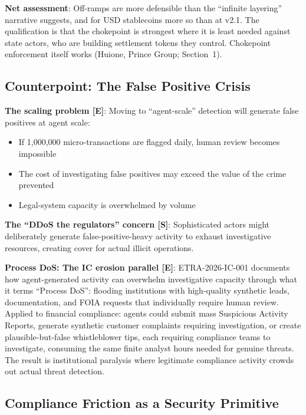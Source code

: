 \documentclass[11pt,letterpaper]{article}
\begin{document}
\textbf{Net assessment}: Off-ramps are more defensible than the ``infinite layering'' narrative suggests, and for USD stablecoins more so than at v2.1. The qualification is that the chokepoint is strongest where it is least needed against state actors, who are building settlement tokens they control. Chokepoint enforcement itself works (Huione, Prince Group; Section~1).

\subsection{Counterpoint: The False Positive Crisis}

\textbf{The scaling problem [E]}: Moving to ``agent-scale'' detection will generate false positives at agent scale:
\begin{itemize}
  \item If 1,000,000 micro-transactions are flagged daily, human review becomes impossible
  \item The cost of investigating false positives may exceed the value of the crime prevented
  \item Legal-system capacity is overwhelmed by volume
\end{itemize}

\textbf{The ``DDoS the regulators'' concern [S]}: Sophisticated actors might deliberately generate false-positive-heavy activity to exhaust investigative resources, creating cover for actual illicit operations.

\textbf{Process DoS: The IC erosion parallel [E]}: ETRA-2026-IC-001 documents how agent-generated activity can overwhelm investigative capacity through what it terms ``Process DoS'': flooding institutions with high-quality synthetic leads, documentation, and FOIA requests that individually require human review. Applied to financial compliance: agents could submit mass Suspicious Activity Reports, generate synthetic customer complaints requiring investigation, or create plausible-but-false whistleblower tips, each requiring compliance teams to investigate, consuming the same finite analyst hours needed for genuine threats. The result is institutional paralysis where legitimate compliance activity crowds out actual threat detection.

\subsection{Compliance Friction as a Security Primitive}
\end{document}
